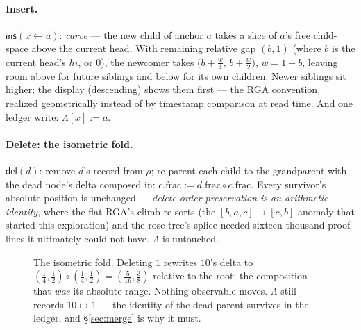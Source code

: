 \documentclass[11pt]{article}
\newcommand{\del}{\mathsf{del}}
\newcommand{\ins}{\mathsf{ins}}
\begin{document}
\paragraph{Insert.} $\ins(x \leftarrow a)$: \emph{carve} --- the new child
of anchor $a$ takes a slice of $a$'s free child-space above the current
head. With remaining relative gap $(b,1)$ (where $b$ is the current head's
$hi$, or $0$), the newcomer takes
$\bigl(b+\tfrac{w}{4},\, b+\tfrac{w}{2}\bigr)$, $w = 1-b$, leaving room
above for future siblings and below for its own children. Newer siblings
sit higher; the display (descending) shows them first --- the RGA
convention, realized geometrically instead of by timestamp comparison at
read time. And one ledger write: $\Lambda[x] := a$.

\paragraph{Delete: the isometric fold.} $\del(d)$: remove $d$'s record
from $\rho$; re-parent each child to the grandparent with the dead node's
delta composed in: $c.\mathrm{frac} := d.\mathrm{frac} \circ
c.\mathrm{frac}$. Every survivor's absolute position is unchanged ---
\emph{delete-order preservation is an arithmetic identity}, where the flat
RGA's climb re-sorts (the $[b,a,c]\to[c,b]$ anomaly that started this
exploration) and the rose tree's splice needed sixteen thousand proof
lines it ultimately could not have. $\Lambda$ is untouched.

\begin{figure}[h]
\centering
{}
\caption{The isometric fold. Deleting $1$ rewrites $10$'s delta to
$(\tfrac14,\tfrac12)\circ(\tfrac14,\tfrac12) = (\tfrac{5}{16},\tfrac38)$
relative to the root: the composition that \emph{was} its absolute range.
Nothing observable moves. $\Lambda$ still records $10 \mapsto 1$ --- the
identity of the dead parent survives in the ledger, and \S\ref{sec:merge}
is why it must.}
\label{fig:fold}
\end{figure}
\end{document}
